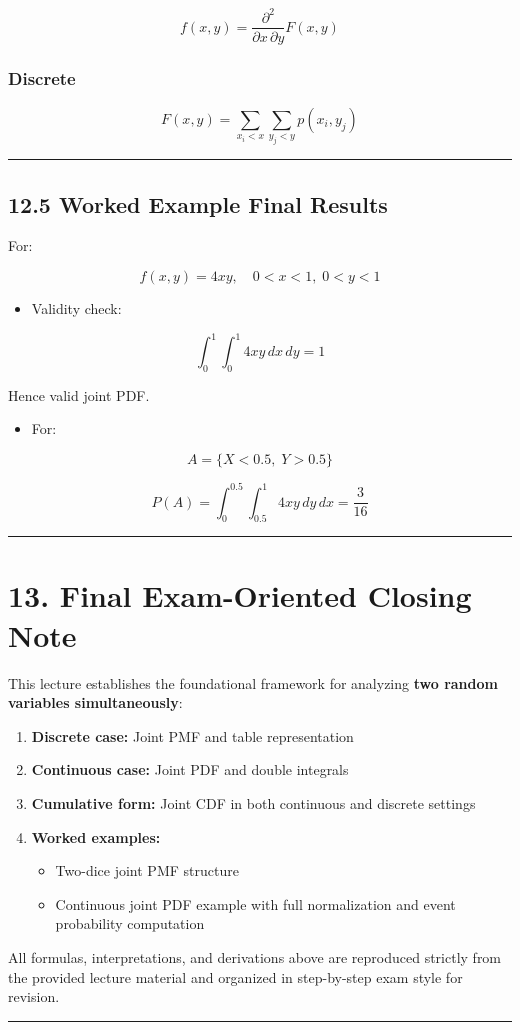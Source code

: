 \documentclass[12pt]{article}
\begin{document}
\[
f(x,y)=\frac{\partial^2}{\partial x\,\partial y}F(x,y)
\]

\subsubsection*{Discrete}

\[
F(x,y)=\sum_{x_i<x}\sum_{y_j<y}p(x_i,y_j)
\]

\hrule
\vspace{1em}

\subsection*{12.5 Worked Example Final Results}

For:

\[
f(x,y)=4xy,\quad 0<x<1,\;0<y<1
\]

\begin{itemize}
    \item Validity check:
\end{itemize}

\[
\int_0^1\int_0^1 4xy\,dx\,dy=1
\]

Hence valid joint PDF.

\begin{itemize}
    \item For:
\end{itemize}

\[
A=\{X<0.5,\;Y>0.5\}
\]

\[
P(A)=\int_0^{0.5}\int_{0.5}^{1}4xy\,dy\,dx=\frac{3}{16}
\]

\hrule
\vspace{1em}

\section*{13. Final Exam-Oriented Closing Note}

This lecture establishes the foundational framework for analyzing \textbf{two random variables simultaneously}:

\begin{enumerate}
    \item \textbf{Discrete case:} Joint PMF and table representation
    \item \textbf{Continuous case:} Joint PDF and double integrals
    \item \textbf{Cumulative form:} Joint CDF in both continuous and discrete settings
    \item \textbf{Worked examples:}
    \begin{itemize}
        \item Two-dice joint PMF structure
        \item Continuous joint PDF example with full normalization and event probability computation
    \end{itemize}
\end{enumerate}

All formulas, interpretations, and derivations above are reproduced strictly from the provided lecture material and organized in step-by-step exam style for revision.

\hrule
\end{document}

